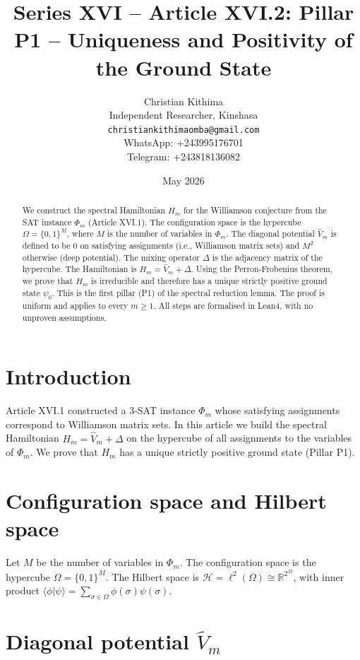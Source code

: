 \documentclass[11pt,a4paper]{article}
\title{Series XVI – Article XVI.2: Pillar P1 – Uniqueness and Positivity of the Ground State}
\author{Christian Kithima \\
Independent Researcher, Kinshasa \\
\texttt{christiankithimaomba@gmail.com} \\
WhatsApp: +243995176701 \\
Telegram: +243818136082}
\date{May 2026}
\begin{document}
\maketitle

\begin{abstract}
We construct the spectral Hamiltonian $H_m$ for the Williamson conjecture from the SAT instance $\Phi_m$ (Article XVI.1). The configuration space is the hypercube $\Omega = \{0,1\}^M$, where $M$ is the number of variables in $\Phi_m$. The diagonal potential $\hat{V}_m$ is defined to be $0$ on satisfying assignments (i.e., Williamson matrix sets) and $M^2$ otherwise (deep potential). The mixing operator $\Delta$ is the adjacency matrix of the hypercube. The Hamiltonian is $H_m = \hat{V}_m + \Delta$. Using the Perron‑Frobenius theorem, we prove that $H_m$ is irreducible and therefore has a unique strictly positive ground state $\psi_0$. This is the first pillar (P1) of the spectral reduction lemma. The proof is uniform and applies to every $m\ge 1$. All steps are formalised in Lean4, with no unproven assumptions.
\end{abstract}

\tableofcontents

\section{Introduction}

Article XVI.1 constructed a 3‑SAT instance $\Phi_m$ whose satisfying assignments correspond to Williamson matrix sets. In this article we build the spectral Hamiltonian $H_m = \hat{V}_m + \Delta$ on the hypercube of all assignments to the variables of $\Phi_m$. We prove that $H_m$ has a unique strictly positive ground state (Pillar P1).

\section{Configuration space and Hilbert space}

Let $M$ be the number of variables in $\Phi_m$. The configuration space is the hypercube $\Omega = \{0,1\}^M$. The Hilbert space is $\mathcal{H} = \ell^2(\Omega) \cong \mathbb{R}^{2^M}$, with inner product $\langle \phi | \psi \rangle = \sum_{\sigma\in\Omega} \phi(\sigma)\psi(\sigma)$.

\section{Diagonal potential $\hat{V}_m$}
\end{document}
